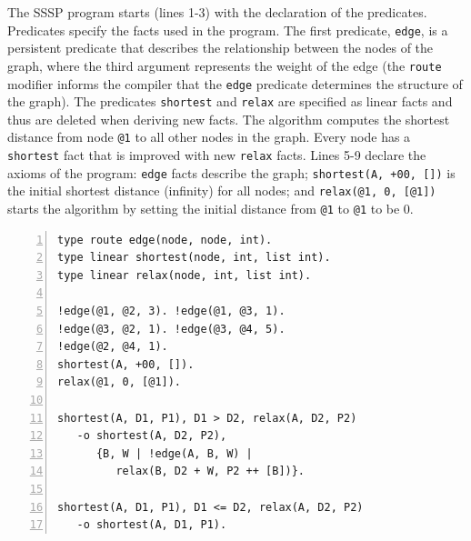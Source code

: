 The SSSP program starts (lines 1-3) with the declaration of the predicates.
Predicates specify the facts used in the program. The first predicate,
\texttt{edge}, is a persistent predicate that describes the
relationship between the nodes of the graph, where the third argument
represents the weight of the edge (the \texttt{route} modifier
informs the compiler that the \texttt{edge} predicate
determines the structure of the graph).  The predicates
\texttt{shortest} and \texttt{relax} are specified as linear facts
and thus are deleted when deriving new facts.  The algorithm computes
the shortest distance from node \texttt{@1} to all other nodes in the
graph. Every node has a \texttt{shortest} fact that is improved with
new \texttt{relax} facts.  Lines 5-9 declare the axioms of the
program: \texttt{edge} facts describe the graph; \texttt{shortest(A,
+00, [])} is the initial shortest distance (infinity) for all
nodes; and \texttt{relax(@1, 0, [@1])} starts the algorithm by
setting the initial distance from \texttt{@1} to \texttt{@1} to be 0.

\begin{topfig}
\scriptsize\begin{Verbatim}[numbers=left]
type route edge(node, node, int).
type linear shortest(node, int, list int).
type linear relax(node, int, list int).

!edge(@1, @2, 3). !edge(@1, @3, 1).
!edge(@3, @2, 1). !edge(@3, @4, 5).
!edge(@2, @4, 1).
shortest(A, +00, []).
relax(@1, 0, [@1]).

shortest(A, D1, P1), D1 > D2, relax(A, D2, P2)
   -o shortest(A, D2, P2),
      {B, W | !edge(A, B, W) |
         relax(B, D2 + W, P2 ++ [B])}.

shortest(A, D1, P1), D1 <= D2, relax(A, D2, P2)
   -o shortest(A, D1, P1).
\end{Verbatim}
\end{topfig}

